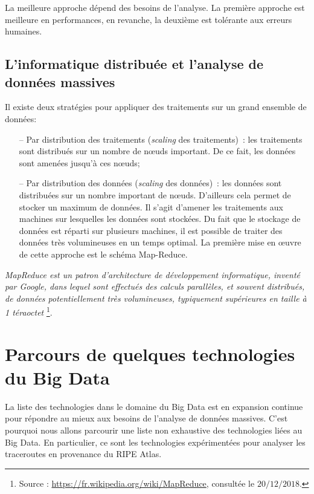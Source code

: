 		La meilleure approche dépend des besoins de l'analyse. La première approche est meilleure en performances, en revanche, la deuxième est tolérante aux erreurs  humaines.
		
		
		\subsection{L'informatique distribuée et l'analyse de données massives} \label{sec:distruted-camput}
		Il existe deux stratégies pour appliquer des traitements sur un grand ensemble de données: 
		
		
		\begin{itemize}
			\item[--] Par distribution des traitements (\textit{scaling} des traitements)~: les traitements sont distribués sur un nombre de n\oe{}uds important. De ce fait, les données sont amenées jusqu'à ces n\oe{}uds;
			
			\item[--] Par distribution des données (\textit{scaling} des données)~: les données sont distribuées sur un nombre important de n\oe{}uds. D'ailleurs cela permet  de stocker un maximum de données. Il s'agit d'amener les traitements aux machines sur lesquelles les données sont stockées. Du fait que le stockage de données est réparti sur plusieurs machines, il est possible de traiter des données très volumineuses en un temps optimal. La première mise en \oe{}uvre de cette approche est le schéma Map-Reduce. 
		\end{itemize}
	
	\begin{tcolorbox}
	\textit{ MapReduce est un patron d'architecture de développement informatique, inventé par Google, dans lequel sont effectués des calculs parallèles, et souvent distribués, de données potentiellement très volumineuses, typiquement supérieures en taille à 1 téraoctet} \footnote{Source : \url{https://fr.wikipedia.org/wiki/MapReduce}, consultée le $20/12/2018$.}. 
	\end{tcolorbox}
	\section{Parcours de quelques technologies du Big Data}
	
La liste des technologies dans le domaine du Big Data est en expansion continue pour répondre au mieux aux besoins de l'analyse de données massives. C'est pourquoi nous allons parcourir une liste non exhaustive des technologies liées au Big Data. En particulier, ce sont les technologies expérimentées pour analyser les traceroutes en provenance du RIPE Atlas.
	
